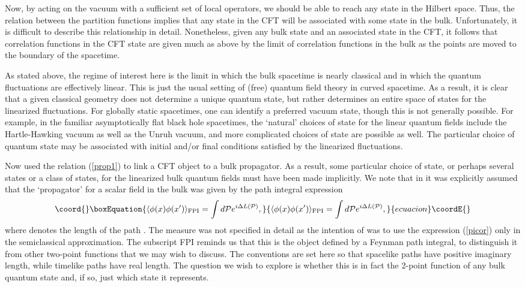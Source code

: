 \documentclass[a4paper,12pt]{article}
\begin{document}
Now, by acting on the vacuum with a sufficient set of local operators,
we should be able to reach any state in the Hilbert space.  Thus, the
relation between the partition functions implies that any state
\myHighlight{$|\Phi\rangle_\partial$}\coordHE{} in the CFT will be associated with some state
\coordHE{} in the bulk.  Unfortunately,  it is
difficult to describe this relationship in detail.  Nonetheless, given
any bulk state and an associated state in the CFT, it follows that
correlation functions in the CFT state are given much as above by the
limit of correlation functions in the bulk as the points are moved to
the boundary of the spacetime.

As stated above, the regime of interest here is the limit in which the
bulk spacetime is nearly classical and in which the quantum
fluctuations are effectively linear.  This is just the usual setting
of (free) quantum field theory in curved spacetime.  As a result, it
is clear that a given classical geometry does not determine a unique
quantum state, but rather determines an entire space of states for the
linearized fluctuations.  For globally static spacetimes, one can
identify a preferred vacuum state, though this is not generally
possible.  For example, in the familiar asymptotically flat black hole
spacetimes, the `natural' choices of state for the linear quantum
fields include the Hartle-Hawking vacuum as well as the Unruh vacuum,
and more complicated choices of state are possible as well.  The
particular choice of quantum state may be associated with initial
and/or final conditions satisfied by the linearized fluctuations.

Now \cite{holopart} used the relation (\ref{prop1}) to link a CFT
object to a bulk propagator.  As a result, some particular choice of
state, or perhaps several states or a class of states, for the
linearized bulk quantum fields must have been made implicitly.  We
note that in \cite{holopart} it was explicitly assumed that the
`propagator' for a scalar field \myHighlight{$\phi$}\coordHE{} in the bulk was given by the
path integral expression
\begin{equation}\coord{}\boxEquation{  
\label{picor}
\langle \phi (x) \phi(x') \rangle_{\rm FPI} = \int d{\cal P} e^{i
\Delta L({\cal P})},
}{  
\langle \phi (x) \phi(x') \rangle_{\rm FPI} = \int d{\cal P} e^{i
\Delta L({\cal P})},
}{ecuacion}\coordE{}\end{equation}
where \coordHE{} denotes the length of the path \coordHE{}.  
The measure \coordHE{} was not specified in detail as
the intention of \cite{holopart} was to use the expression
(\ref{picor}) only in the semiclassical approximation.  The
subscript FPI reminds us that this is the object defined by a Feynman
path integral, to distinguish it from other two-point functions that
we may wish to discuss.  The conventions are set here so that
spacelike paths have positive imaginary length, while timelike paths
have real length.  The question we wish to explore is whether this is
in fact the 2-point function of any bulk quantum state and, if so,
just which state it represents.
\end{document}
